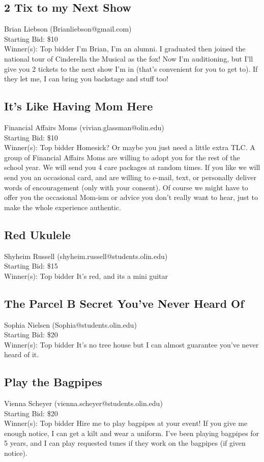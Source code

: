 \documentclass[11pt]{article}
\begin{document}
\subsection{2 Tix to my Next Show}
Brian Liebson (Brianliebson@gmail.com) \\
Starting Bid: \$10 \\
Winner(s): 
Top bidder\newline
I'm Brian, I'm an alumni. I graduated then joined the national tour of Cinderella the Musical as the fox! Now I'm auditioning, but I'll give you 2 tickets to the next show I'm in (that's convenient for you to get to). If they let me, I can bring you backstage and stuff too!
\subsection{It's Like Having Mom Here}
Financial Affairs Moms (vivian.glassman@olin.edu) \\
Starting Bid: \$10 \\
Winner(s): 
Top bidder\newline
Homesick?  Or maybe you just need a little extra TLC.  A group of Financial Affairs Moms are willing to adopt you for the rest of the school year.  We will send you 4 care packages at random times.  If you like we will send you an occasional card, and are willing to e-mail, text, or personally deliver words of encouragement (only with your consent).  Of course we might have to offer you the occasional Mom-ism or advice you don’t really want to hear, just to make the whole experience authentic.
\subsection{Red Ukulele }
Shyheim Russell (shyheim.russell@students.olin.edu) \\
Starting Bid: \$15 \\
Winner(s): 
Top bidder\newline
It's red, and its a mini guitar
\subsection{The Parcel B Secret You've Never Heard Of}
Sophia Nielsen (Sophia@students.olin.edu) \\
Starting Bid: \$20 \\
Winner(s): 
Top bidder\newline
It's no tree house but I can almost guarantee you've never heard of it.
\subsection{Play the Bagpipes}
Vienna Scheyer (vienna.scheyer@students.olin.edu) \\
Starting Bid: \$20 \\
Winner(s): 
Top bidder\newline
Hire me to play bagpipes at your event! If you give me enough notice, I can get a kilt and wear a uniform. I've been playing bagpipes for 5 years, and I can play requested tunes if they work on the bagpipes (if given notice).
\end{document}
